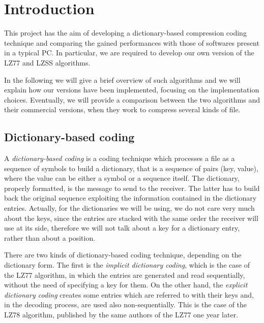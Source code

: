 \section{Introduction}
This project has the aim of developing a dictionary-based compression coding technique and comparing the gained performances with those of softwares present in a typical PC. In particular, we are required to develop our own version of the LZ77 and LZSS algorithms.

In the following we will give a brief overview of such algorithms and we will explain how our versions have been implemented, focusing on the implementation choices. Eventually, we will provide a comparison between the two algorithms and their commercial versions, when they work to compress several kinds of file.

\subsection{Dictionary-based coding} \label{subsec:dict-base}
A \textit{dictionary-based coding} is a coding technique which processes a file as a sequence of symbols to build a dictionary, that is a sequence of pairs (key, value), where the value can be either a symbol or a sequence itself. The dictionary, properly formatted, is the message to send to the receiver. The latter has to build back the original sequence exploiting the information contained in the dictionary entries. Actually, for the dictionaries we will be using, we do not care very much about the keys, since the entries are stacked with the same order the receiver will use at its side, therefore we will not talk about a key for a dictionary entry, rather than about a position.

There are two kinds of dictionary-based coding technique, depending on the dictionary form. The first is the \textit{implicit dictionary coding}, which is the case of the LZ77 algorithm, in which the entries are generated and read sequentially, without the need of specifying a key for them. On the other hand, the \textit{explicit dictionary coding} creates some entries which are referred to with their keys and, in the decoding process, are used also non-sequentially. This is the case of the LZ78 algorithm, published by the same authors of the LZ77 one year later.



